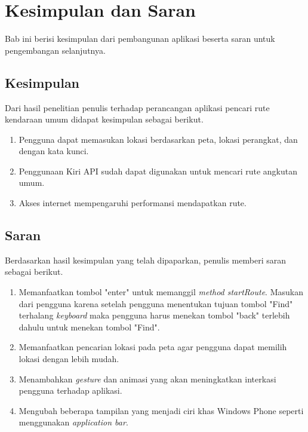 \chapter{Kesimpulan dan Saran}
\label{chap:Kesimpulan dan Saran}
Bab ini berisi kesimpulan dari pembangunan aplikasi beserta saran untuk pengembangan selanjutnya.

\section{Kesimpulan}
\label{lab:Kesimpulan}
\hspace{0.5cm} Dari hasil penelitian penulis terhadap perancangan aplikasi pencari rute kendaraan umum didapat kesimpulan sebagai berikut.
\begin{enumerate}
	\item Pengguna dapat memasukan lokasi berdasarkan peta, lokasi perangkat, dan dengan kata kunci.
	\item Penggunaan Kiri API sudah dapat digunakan untuk mencari rute angkutan umum.
	\item Akses internet mempengaruhi performansi mendapatkan rute.
\end{enumerate}

\section{Saran}
\label{lab:Saran}
\hspace{0.5cm} Berdasarkan hasil kesimpulan yang telah dipaparkan, penulis memberi saran sebagai berikut.
\begin{enumerate}
	\item Memanfaatkan tombol "enter" untuk memanggil \textit{method startRoute}. Masukan dari pengguna karena setelah pengguna menentukan tujuan tombol "Find" terhalang \textit{keyboard} maka pengguna harus menekan tombol "back" terlebih dahulu untuk menekan tombol "Find".
	\item Memanfaatkan pencarian lokasi pada peta agar pengguna dapat memilih lokasi dengan lebih mudah.
	\item Menambahkan \textit{gesture} dan animasi yang akan meningkatkan interkasi pengguna terhadap aplikasi.
	\item Mengubah beberapa tampilan yang menjadi ciri khas Windows Phone seperti menggunakan \textit{application bar}.
\end{enumerate}